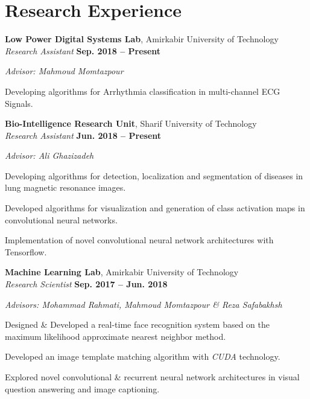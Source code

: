 \section{\sc Research Experience}

{\bf Low Power Digital Systems Lab}, Amirkabir University of Technology \\ 
\vspace{0.1cm}
\textit{Research Assistant} \hfill{\textbf{Sep. 2018 -- Present}} \\
\vspace{-0.4cm}
\begin{list2}
	\item \textit{Advisor: Mahmoud Momtazpour}
	\item Developing algorithms for Arrhythmia classification in multi-channel ECG Signals.
\end{list2}


{\bf Bio-Intelligence Research Unit}, Sharif University of Technology \\ 
\vspace{0.1cm}
\textit{Research Assistant} \hfill{\textbf{Jun. 2018 -- Present}} \\
\vspace{-0.4cm}
\begin{list2}
	\item \textit{Advisor: Ali Ghazizadeh}
	\item Developing algorithms for detection, localization and segmentation of diseases in lung magnetic resonance images.
	\item Developed algorithms for visualization and generation of class activation maps in convolutional neural networks.
	\item Implementation of novel convolutional neural network architectures with Tensorflow.
\end{list2}

{\bf Machine Learning Lab}, Amirkabir University of Technology \\ 
\vspace{0.1cm}
\textit{Research Scientist} \hfill{\textbf{Sep. 2017 -- Jun. 2018}} \\
\vspace{-0.4cm}
\begin{list2}
	\item \textit{Advisors: Mohammad Rahmati, Mahmoud Momtazpour \& Reza Safabakhsh}
	\item Designed \& Developed a real-time face recognition system based on the maximum likelihood approximate nearest neighbor method.
	
	\item Developed an image template matching algorithm with \textit{CUDA} technology.
	
	\item Explored novel convolutional \& recurrent neural network architectures in visual question answering and image captioning.
\end{list2}

\endinput